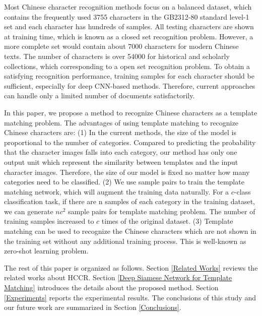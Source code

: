 \documentclass[conference]{IEEEtran}
\begin{document}
Most Chinese character recognition methods focus on a balanced dataset, which contains the frequently used 3755 characters in the GB2312-80 standard level-1 set and each character has hundreds of samples. All testing characters are shown at training time, which is known as a closed set recognition problem. However, a more complete set would contain about 7000 characters for modern Chinese texts. The number of characters is over 54000 for historical and scholarly collections, which corresponding to a open set recognition problem. To obtain a satisfying recognition performance, training samples for each character should be sufficient, especially for deep CNN-based methods. Therefore, current approaches can handle only a limited number of documents satisfactorily.          

In this paper, we propose a method to recognize Chinese characters as a template matching problem. The advantages of using template matching to recognize Chinese characters are: (1) In the current methods, the size of the model is proportional to the number of categories. Compared to predicting the probability that the character images falls into each category, our method has only one output unit which represent the similarity between templates and the input character images. Therefore, the size of our model is fixed no matter how many categories need to be classified. (2) We use sample pairs to train the template matching network, which will augment the training data naturally. For a $c$-class classification task, if there are n samples of each category in the training dataset, we can generate $nc^2$ sample pairs for template matching problem. The number of training samples increased to $c$ times of the original dataset. (3) Template matching can be used to recognize the Chinese characters which are not shown in the training set without any additional training process. This is well-known as zero-shot learning problem.

The rest of this paper is organized as follows. Section \ref{Related Works} reviews the related works about HCCR. Section \ref{Deep Siamese Network for Template Matching} introduces the details about the proposed method. Section \ref{Experiments}
reports the experimental results. The conclusions of this study and our future work are summarized in Section \ref{Conclusions}.

%
%
\end{document}
